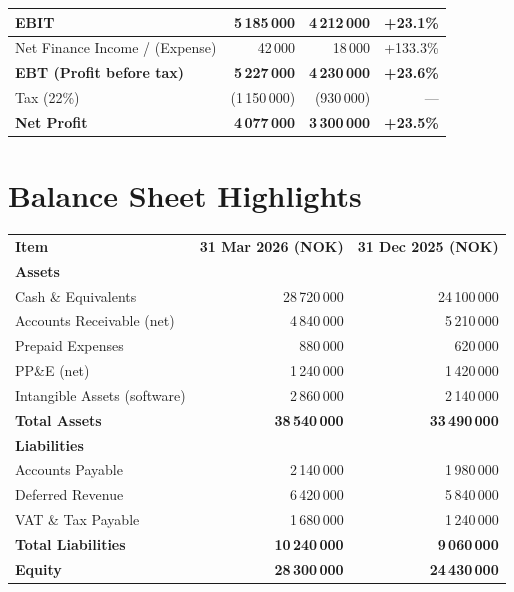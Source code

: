 \documentclass[a4paper,11pt]{article}
\begin{document}
\begin{tabularx}{\textwidth}{Xrrr}
  \textbf{EBIT} & \textbf{5\,185\,000} & \textbf{4\,212\,000} & \textbf{+23.1\%} \\
  \midrule
  \rowcolor{lightgray}
  Net Finance Income / (Expense) & 42\,000 & 18\,000 & +133.3\% \\
  \textbf{EBT (Profit before tax)} & \textbf{5\,227\,000} & \textbf{4\,230\,000} & \textbf{+23.6\%} \\
  \rowcolor{lightgray}
  Tax (22\%) & (1\,150\,000) & (930\,000) & --- \\
  \midrule
  \rowcolor{brand}
  \color{white}\textbf{Net Profit} &
  \color{white}\textbf{4\,077\,000} &
  \color{white}\textbf{3\,300\,000} &
  \color{white}\textbf{+23.5\%} \\
  \bottomrule
\end{tabularx}

\section{Balance Sheet Highlights}

\begin{tabularx}{\textwidth}{Xrr}
  \rowcolor{brand}
  \color{white}\textbf{Item} &
  \color{white}\textbf{31 Mar 2026 (NOK)} &
  \color{white}\textbf{31 Dec 2025 (NOK)} \\
  \rowcolor{lightgray}
  \textbf{Assets} & & \\
  Cash \& Equivalents & 28\,720\,000 & 24\,100\,000 \\
  \rowcolor{lightgray}
  Accounts Receivable (net) & 4\,840\,000 & 5\,210\,000 \\
  Prepaid Expenses & 880\,000 & 620\,000 \\
  \rowcolor{lightgray}
  PP\&E (net) & 1\,240\,000 & 1\,420\,000 \\
  Intangible Assets (software) & 2\,860\,000 & 2\,140\,000 \\
  \rowcolor{lightgray}
  \textbf{Total Assets} & \textbf{38\,540\,000} & \textbf{33\,490\,000} \\
  \midrule
  \rowcolor{lightgray}
  \textbf{Liabilities} & & \\
  Accounts Payable & 2\,140\,000 & 1\,980\,000 \\
  \rowcolor{lightgray}
  Deferred Revenue & 6\,420\,000 & 5\,840\,000 \\
  VAT \& Tax Payable & 1\,680\,000 & 1\,240\,000 \\
  \rowcolor{lightgray}
  \textbf{Total Liabilities} & \textbf{10\,240\,000} & \textbf{9\,060\,000} \\
  \midrule
  \rowcolor{brand}
  \color{white}\textbf{Equity} &
  \color{white}\textbf{28\,300\,000} &
  \color{white}\textbf{24\,430\,000} \\
  \bottomrule
\end{tabularx}
\end{document}
